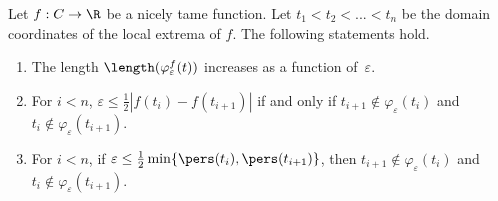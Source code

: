 \begin{lem}
    Let $f:C\rightarrow \R$ be a nicely tame function.
    Let $t_1<t_2<...<t_n$ be the domain coordinates of the local extrema of $f$.
    The following statements hold.
    \begin{enumerate}
        \item The length $\length(\varphi^f_{\varepsilon}(t))$
            increases as a function of~$\varepsilon$. 
            \label{stmt:monotonicity}\label{stmt:properties-inc}
        \item For $i<n$, $\varepsilon \leq \frac{1}{2}|f(t_i)-f(t_{i+1})|$ if and only if
            $t_{i+1} \notin \varphi_{\varepsilon}(t_i)$ and $t_{i} \notin
            \varphi_{\varepsilon}(t_{i+1})$.
            \label{stmt:extrema-containment}\label{stmt:properties-epsiff}
        \item For $i<n$, if $\varepsilon \leq \frac{1}{2}\min\{\pers(t_i), \pers(t_{i+1})\}$,
            then $t_{i+1} \notin \varphi_{\varepsilon}(t_i)$ and $t_{i} \notin
            \varphi_{\varepsilon}(t_{i+1})$.
            \label{stmt:nodelife-extrema-containment}\label{stmt:properties-extrema-containment}
    \end{enumerate}
    \label{lem:properties}
\end{lem}

